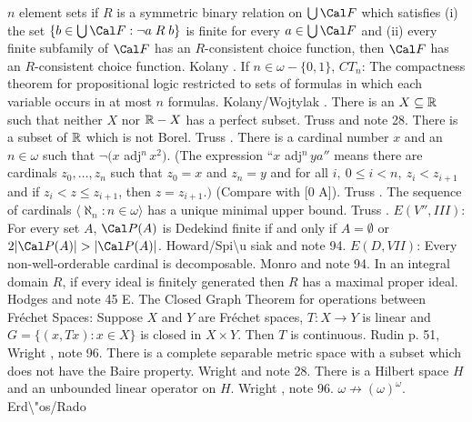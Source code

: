 $n$ element sets if $R$ is a symmetric binary relation on
$\bigcup {\Cal F}$ which satisfies (i) the set $\{ b\in \bigcup
{\Cal F} : \neg a\mathrel R b\}$ is finite
for every $a \in \bigcup {\Cal F}$ and (ii) every finite subfamily of
${\Cal F}$ has an $R$-consistent choice function, then
${\Cal F}$ has an $R$-consistent choice function. \ac{Kolany} \cite{1992}.
\medskip
{} If $n\in\omega-\{0,1\}$, $CT_{n}$:
The compactness theorem for propositional logic restricted to sets
of formulas in which each variable occurs in at most $n$ formulas.
\ac{Kolany/Wojtylak} \cite{1991}.
\medskip
{} There is an $X\subseteq{\Bbb R}$ such that
neither $X$ nor $\Bbb R - X$ has a perfect subset.
\ac{Truss} \cite{1974b} and note 28.
\medskip
{} There is a subset of ${\Bbb R}$ which is not
Borel. \ac{Truss} \cite{1974b}.
\medskip
{} There is a cardinal number $x$ and an $n\in\omega$
such that $\neg(x$ adj$^n\, x^2)$. (The expression ``$x$ adj$^n\, ya''$
means there are cardinals $z_0,\ldots, z_n$ such that $z_0 = x$ and
$z_n = y$ and for all $i,\ 0\le i < n,\ z_i< z_{i+1}$ and if  $z_i < z\le
z_{i+1}$, then $z = z_{i+1}.)$ (Compare with [0 A]). \ac{Truss}
\cite{1974b}.
\medskip
{} The sequence of cardinals $\langle\aleph_n: n
\in\omega\rangle$ has a unique minimal upper bound.  \ac{Truss}
\cite{1974b}.
\medskip
{} $E(V'',III)$: For every set $A$, ${\Cal P}(A)$ is
Dedekind finite if and only if $A = \emptyset$  or $2|{\Cal P}(A)| >
|{\Cal P}(A)|$. \ac{Howard/Spi\u siak} \cite{1994} and note 94.
\medskip
{} $E(D,VII)$: Every non-well-orderable cardinal is
decomposable. \ac{Monro} \cite{1973a} and note 94.
\medskip
{} In an integral domain $R$, if every ideal is
finitely generated then $R$ has a maximal proper ideal. \ac{Hodges}
\cite{1974} and note 45 E.
\medskip
{} The Closed Graph Theorem for operations
between Fr\'echet Spaces: Suppose $X$ and $Y$ are Fr\'echet spaces,
$T:X\to Y$ is linear and $G=\{(x,Tx): x \in X \}$ is closed in $X\times
Y$. Then $T$ is continuous. \ac{Rudin} \cite{1991} p. 51, \ac{Wright}
\cite{1973},
note 96.  
\medskip
{}  There is a complete separable metric space
with a subset which does not have the Baire property.
\ac{Wright} \cite{1973} and note 28.
\medskip
{}  There is a Hilbert space $H$ and an  unbounded
linear operator on $H$.  \ac{Wright} \cite{1973}, note 96.
\medskip
{} $\omega\not\to(\omega)^{\omega}$. \ac{Erd\"os/Rado}
